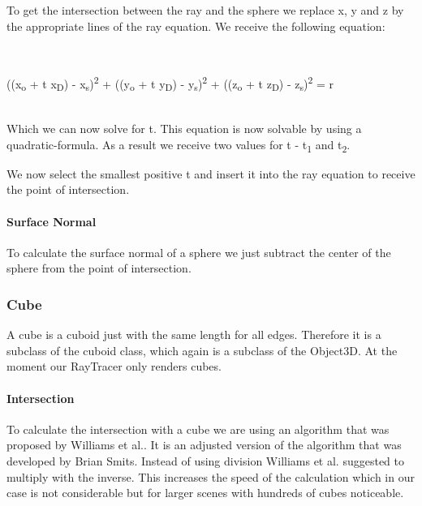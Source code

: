 \documentclass[10pt]{scrartcl}
\begin{document}
To get the intersection between the ray and the sphere we replace x, y and z by the appropriate lines of the ray equation. We receive the following equation:

\\
\begin{center}

((x\textsubscript{o} + t x\textsubscript{D}) - x\textsubscript{s})\textsuperscript{2} + ((y\textsubscript{o} + t y\textsubscript{D}) - y\textsubscript{s})\textsuperscript{2} + ((z\textsubscript{o} + t z\textsubscript{D}) - z\textsubscript{s})\textsuperscript{2}  = r

\end{center}
\\

Which we can now solve for t. This equation is now solvable by using a quadratic-formula. As a result we receive two values for t - t\textsubscript{1} and t\textsubscript{2}.

We now select the smallest positive t and insert it into the ray equation to receive the point of intersection. 

\paragraph{Surface Normal}

To calculate the surface normal of a sphere we just subtract the center of the sphere from the point of intersection.

\subsubsection{Cube}

A cube is a cuboid just with the same length for all edges. Therefore it is a subclass of the cuboid class, which again is a subclass of the Object3D. At the moment our RayTracer only renders cubes. 

\paragraph{Intersection}

To calculate the intersection with a cube we are using an algorithm that was proposed by Williams et al.. It is an adjusted version of the algorithm that was developed by Brian Smits. Instead of using division Williams et al. suggested to multiply with the inverse. This increases the speed of the calculation which in our case is not considerable but for larger scenes with hundreds of cubes noticeable. 
\end{document}
